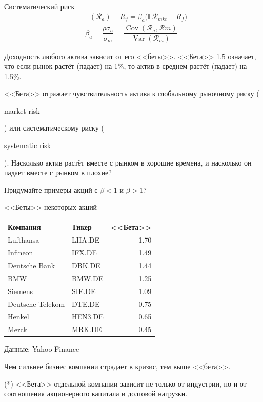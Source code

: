 \documentclass{beamer}
\newcommand{\en}[1]{\begin{otherlanguage}{english}#1\end{otherlanguage}}
\begin{document}
\begin{frame}{Систематический риск}
\justify
\begin{align*}
&\mathbb{E}(\mathcal{R}_{a}) - R_{f} =
\beta_{a}\big(
	\mathbb{E}\mathcal{R}_{mkt} - R_{f}		
\big) \\
&\beta_a = \dfrac{\rho\sigma_a}{\sigma_m} =
\dfrac{\operatorname{Cov}(\mathcal{R}_a, \mathcal{R}m)}
{\operatorname{Var}(\mathcal{R}_m)}
\end{align*}

\justify
Доходность любого актива зависит от его <<беты>>. <<Бета>> 1.5 означает, что 
если рынок растёт (падает) на 1\%, то актив в среднем растёт (падает) на 1.5\%. 

\justify
<<Бета>> отражает чувствительность актива к глобальному 
рыночному риску (\en{market risk}) или систематическому риску (\en{systematic 
risk}). Насколько актив растёт вместе с рынком в хорошие времена, и насколько 
он падает вместе с рынком в плохие?

\justify
Придумайте примеры акций с $\beta<1$ и $\beta>1$?
\end{frame}



\begin{frame}{<<Беты>> некоторых акций}
\centering
\begin{tabular}{l|l|r}
Компания         & Тикер   & <<Бета>> \\ \hline
Lufthansa        & LHA.DE  & 1.70     \\
Infineon         & IFX.DE  & 1.49     \\
Deutsche Bank    & DBK.DE  & 1.44     \\
BMW              & BMW.DE  & 1.25     \\
Siemens          & SIE.DE  & 1.09     \\
Deutsche Telekom & DTE.DE  & 0.75     \\
Henkel           & HEN3.DE & 0.65    \\
Merck            & MRK.DE  & 0.45     
\end{tabular}

\justify
\centering
{\scriptsize Данные: Yahoo Finance}

\justify
Чем сильнее бизнес компании страдает в кризис, тем выше <<бета>>.

\justify
(*) <<Бета>> отдельной компании зависит не только от индустрии, но и от 
соотношения акционерного капитала и долговой нагрузки.
\end{frame}
\end{document}
